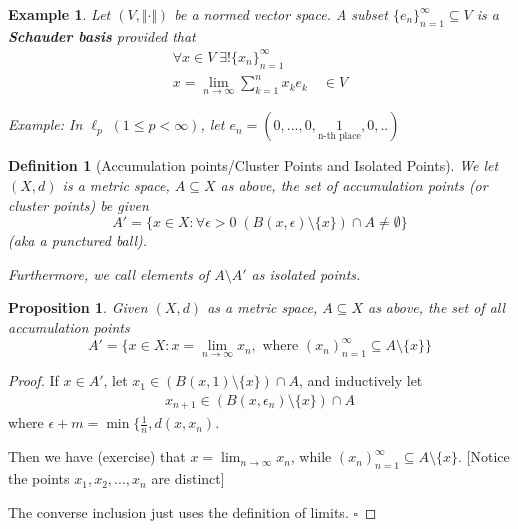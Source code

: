 \documentclass[11pt, oneside]{book}
\theoremstyle{break}
\newtheorem*{proof}{Proof}
\newtheorem{propo}{Proposition}[section]
\newtheorem{defn}{Definition}[section]
\newtheorem{eg}{Example}[section]
\newcommand{\qed}{\hfill\ensuremath{\square}}	%
\begin{document}
\begin{eg}
	Let $(V, \Vert \cdot \Vert)$ be a normed vector space. A subset $\{e_n\}_{n = 1}^\infty \subseteq V$ is a \textbf{Schauder basis} provided that
	\begin{gather*}
		\forall x \in V \; \exists! \{x_n\}_{n = 1}^\infty \\
		x = \lim_{n \to \infty} \sum_{k=1}^{n} x_k e_k \quad \in V
	\end{gather*}

	Example: In $\ell_p \; (1 \leq p < \infty)$, let $e_n = (0, ..., 0, \underset{\text{n-th place}}{1}, 0, ..)$
\end{eg}

\begin{defn}[Accumulation points/Cluster Points and Isolated Points]
	We let $(X, d)$ is a metric space, $A \subseteq X$ as above, the set of accumulation points (or cluster points) be given
	\begin{equation}
		A' = \{x \in X : \forall \epsilon > 0 \; \left( B(x, \epsilon) \setminus \{x\} \right) \cap A \neq \emptyset \}
	\end{equation}
	(aka a punctured ball).

	Furthermore, we call elements of $A \setminus A'$ as isolated points.
\end{defn}

\begin{propo}
	Given $(X, d)$ as a metric space, $A \subseteq X$ as above, the set of all accumulation points
	\begin{equation*}
		A' = \{x \in X : x = \lim_{n \to \infty} x_n, \text{ where } (x_n)_{n = 1}^\infty \subseteq A \setminus \{x\} \}
	\end{equation*}
\end{propo}

\begin{proof}
	If $x \in A'$, let $x_1 \in \left( B(x, 1)\setminus\{x\} \right) \cap A$, and inductively let
	\begin{gather*}
		x_{n + 1} \in \left( B (x, \epsilon_n) \setminus \{x\} \right) \cap A
	\end{gather*}
	where $\epsilon+m = \min\{\frac{1}{n}, d(x, x_n)$.

	Then we have (exercise) that $x = \lim_{n \to \infty} x_n$, while $(x_n)_{n = 1}^\infty \subseteq A \setminus \{x\}$. [Notice the points $x_1, x_2, ..., x_n$ are distinct]

	The converse inclusion just uses the definition of limits. \qed
\end{proof}
\end{document}
